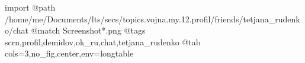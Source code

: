  
 
 
 
 

\ifcmt
  import
  @path /home/me/Documents/lts/secs/topics.vojna.my.12.profil/friends/tetjana_rudenko/chat
  @match Screenshot*.png
  @tags scrn,profil,demidov,ok_ru,chat,tetjana_rudenko
  @tab cols=3,no_fig,center,env=longtable
\fi

